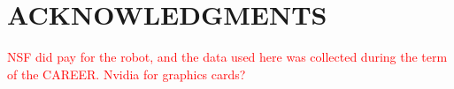 \documentclass[letterpaper, 10 pt, conference]{ieeeconf}  %
\newcommand{\comment}[1]{\textcolor{red}{#1}}
\begin{document}
\section*{ACKNOWLEDGMENTS}

\comment{NSF did pay for the robot, and the data used here was collected during the term of the CAREER.  Nvidia for graphics cards?}


{\small

%

}







\end{document}
